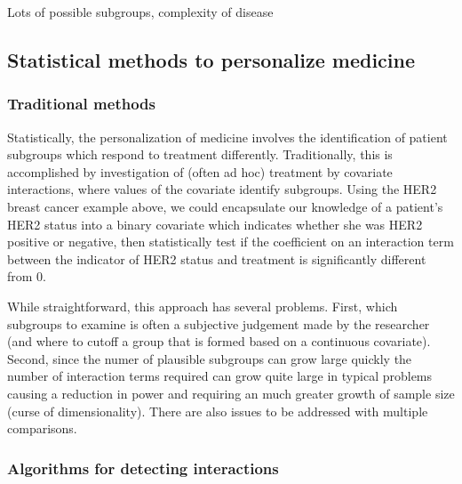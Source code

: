 \documentclass[12pt]{article}
\begin{document}
Lots of possible subgroups, complexity of disease

\subsection{Statistical methods to personalize medicine} %
\label{sub:statistical_methods_to_personalize_medicine}


\subsubsection{Traditional methods} %
\label{ssub:traditional_methods}


Statistically, the personalization of medicine involves the identification of patient subgroups which respond to treatment differently. Traditionally, this is accomplished by investigation of (often ad hoc) treatment by covariate interactions, where values of the covariate identify subgroups. Using the HER2 breast cancer example above, we could encapsulate our knowledge of a patient's HER2 status into a binary covariate which indicates whether she was HER2 positive or negative, then statistically test if the coefficient on an interaction term between the indicator of HER2 status and treatment is significantly different from 0.


While straightforward, this approach has several problems. First, which subgroups to examine is often a subjective judgement made by the researcher (and where to cutoff a group that is formed based on a continuous covariate). Second, since the numer of plausible subgroups can grow large quickly the number of interaction terms required can grow quite large in typical problems causing a reduction in power and requiring an much greater growth of sample size (curse of dimensionality). There are also issues to be addressed with multiple comparisons.

\subsubsection{Algorithms for detecting interactions} %
\label{ssub:algorithms_for_detecting_interactions}
\end{document}
